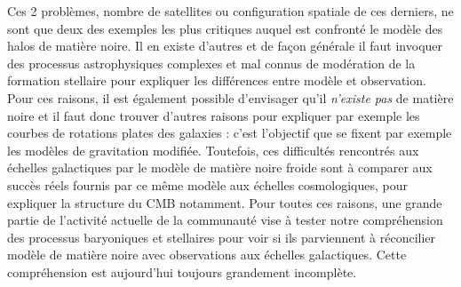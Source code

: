 Ces 2 problèmes, nombre de satellites ou configuration spatiale de ces derniers, ne sont que deux des exemples les plus critiques auquel est confronté le modèle des halos de matière noire. Il en existe d'autres et de façon générale il faut invoquer des processus astrophysiques complexes et mal connus de modération de la formation stellaire pour expliquer les différences entre modèle et observation. Pour ces raisons, il est également possible d'envisager qu'il \textit{n'existe pas} de matière noire et il faut donc trouver d'autres raisons pour expliquer par exemple les courbes de rotations plates des galaxies : c'est l'objectif que se fixent par exemple les modèles de gravitation modifiée. Toutefois, ces difficultés rencontrés aux échelles galactiques par le modèle de matière noire froide sont à comparer aux succès réels fournis par ce même modèle aux échelles cosmologiques, pour expliquer la structure du CMB notamment. Pour toutes ces raisons, une grande partie de l'activité actuelle de la communauté vise à tester notre compréhension des processus baryoniques et stellaires pour voir si ils parviennent à réconcilier modèle de matière noire avec observations aux échelles galactiques. Cette compréhension est aujourd'hui toujours grandement incomplète.
